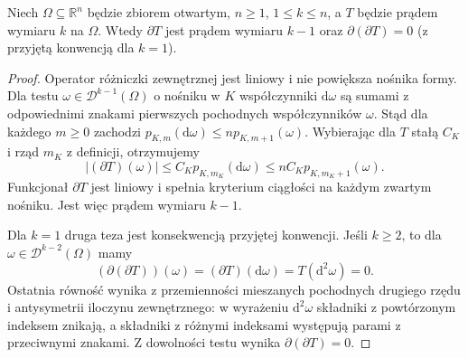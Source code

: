 \begin{lemat}
\label{lem:current-boundary-square-29}
Niech $\Omega\subseteq\mathbb R^n$ będzie zbiorem otwartym,
$n\ge1$, $1\le k\le n$, a $T$ będzie prądem
wymiaru $k$ na $\Omega$. Wtedy $\partial T$
jest prądem wymiaru $k-1$ oraz
$\partial(\partial T)=0$ (z przyjętą konwencją
dla $k=1$).
\end{lemat}
\begin{proof}
Operator różniczki zewnętrznej jest liniowy
i nie powiększa nośnika formy. Dla testu
$\omega\in\mathcal D^{k-1}(\Omega)$ o nośniku
w $K$ współczynniki $\mathrm d\omega$
są sumami z odpowiednimi znakami pierwszych
pochodnych współczynników $\omega$.
Stąd dla każdego $m\ge0$ zachodzi
$p_{K,m}(\mathrm d\omega)\le n p_{K,m+1}(\omega)$.
Wybierając dla $T$ stałą $C_K$ i rząd $m_K$
z definicji, otrzymujemy
\[
 |(\partial T)(\omega)|
 \le C_K p_{K,m_K}(\mathrm d\omega)
 \le n C_K p_{K,m_K+1}(\omega).
\]
Funkcjonał $\partial T$ jest liniowy i spełnia
kryterium ciągłości na każdym zwartym nośniku.
Jest więc prądem wymiaru $k-1$.

Dla $k=1$ druga teza jest konsekwencją przyjętej
konwencji. Jeśli $k\ge2$, to dla
$\omega\in\mathcal D^{k-2}(\Omega)$ mamy
\[
 (\partial(\partial T))(\omega)
 =(\partial T)(\mathrm d\omega)
 =T(\mathrm d^2\omega)=0.
\]
Ostatnia równość wynika z przemienności
mieszanych pochodnych drugiego rzędu i
antysymetrii iloczynu zewnętrznego:
w wyrażeniu $\mathrm d^2\omega$ składniki
z powtórzonym indeksem znikają, a składniki
z różnymi indeksami występują parami
z przeciwnymi znakami. Z dowolności testu
wynika $\partial(\partial T)=0$.
\end{proof}

